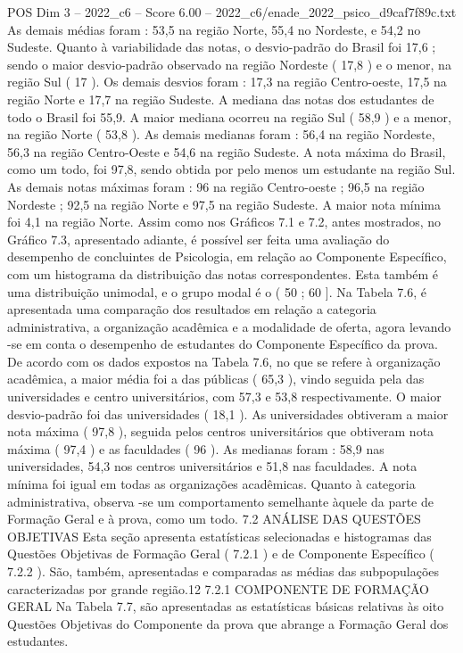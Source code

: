 \begin{textsample}{POS Dim 3 – 2022\_c6 – Score 6.00 – 2022\_c6/enade\_2022\_psico\_d9caf7f89c.txt}
As demais médias foram : 53,5 na região Norte, 55,4 no Nordeste, e 54,2 no Sudeste.
Quanto à variabilidade das notas, o desvio-padrão do Brasil foi 17,6 ; sendo o maior desvio-padrão observado na região Nordeste ( 17,8 ) e o menor, na região Sul ( 17 ).
Os demais desvios foram : 17,3 na região Centro-oeste, 17,5 na região Norte e 17,7 na região Sudeste.
A mediana das notas dos estudantes de todo o Brasil foi 55,9.
A maior mediana ocorreu na região Sul ( 58,9 ) e a menor, na região Norte ( 53,8 ).
As demais medianas foram : 56,4 na região Nordeste, 56,3 na região Centro-Oeste e 54,6 na região Sudeste.
A nota máxima do Brasil, como um todo, foi 97,8, sendo obtida por pelo menos um estudante na região Sul.
As demais notas máximas foram : 96 na região Centro-oeste ; 96,5 na região Nordeste ; 92,5 na região Norte e 97,5 na região Sudeste.
A maior nota mínima foi 4,1 na região Norte.
Assim como nos Gráficos 7.1 e 7.2, antes mostrados, no Gráfico 7.3, apresentado adiante, é possível ser feita uma avaliação do desempenho de concluintes de Psicologia, em relação ao Componente Específico, com um histograma da distribuição das notas correspondentes.
Esta também é uma distribuição unimodal, e o grupo modal é o ( 50 ; 60 ].
Na Tabela 7.6, é apresentada uma comparação dos resultados em relação a categoria administrativa, a organização acadêmica e a modalidade de oferta, agora levando -se em conta o desempenho de estudantes do Componente Específico da prova.
De acordo com os dados expostos na Tabela 7.6, no que se refere à organização acadêmica, a maior média foi a das públicas ( 65,3 ), vindo seguida pela das universidades e centro universitários, com 57,3 e 53,8 respectivamente.
O maior desvio-padrão foi das universidades ( 18,1 ).
As universidades obtiveram a maior nota máxima ( 97,8 ), seguida pelos centros universitários que obtiveram nota máxima ( 97,4 ) e as faculdades ( 96 ).
As medianas foram : 58,9 nas universidades, 54,3 nos centros universitários e 51,8 nas faculdades.
A nota mínima foi igual em todas as organizações acadêmicas.
Quanto à categoria administrativa, observa -se um comportamento semelhante àquele da parte de Formação Geral e à prova, como um todo. 7.2 ANÁLISE DAS QUESTÕES OBJETIVAS Esta seção apresenta estatísticas selecionadas e histogramas das Questões Objetivas de Formação Geral ( 7.2.1 ) e de Componente Específico ( 7.2.2 ).
São, também, apresentadas e comparadas as médias das subpopulações caracterizadas por grande região.12 7.2.1 COMPONENTE DE FORMAÇÃO GERAL Na Tabela 7.7, são apresentadas as estatísticas básicas relativas às oito Questões Objetivas do Componente da prova que abrange a Formação Geral dos estudantes.

\end{textsample}
